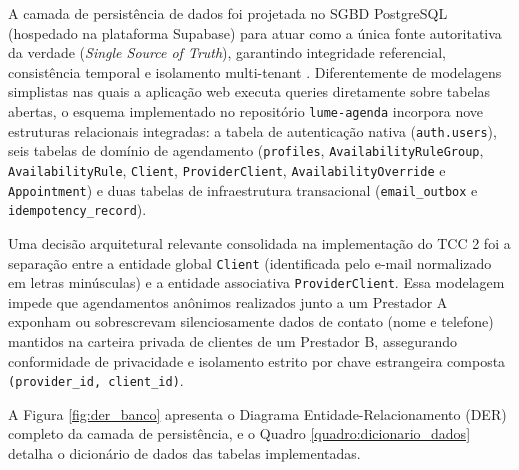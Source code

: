 \documentclass[12pt,a4paper]{article}
\begin{document}
A camada de persistência de dados foi projetada no SGBD PostgreSQL (hospedado na plataforma Supabase) para atuar como a única fonte autoritativa da verdade (\textit{Single Source of Truth}), garantindo integridade referencial, consistência temporal e isolamento multi-tenant \cite{elmasri2018}. Diferentemente de modelagens simplistas nas quais a aplicação web executa queries diretamente sobre tabelas abertas, o esquema implementado no repositório \texttt{lume-agenda} incorpora nove estruturas relacionais integradas: a tabela de autenticação nativa (\texttt{auth.users}), seis tabelas de domínio de agendamento (\texttt{profiles}, \texttt{AvailabilityRuleGroup}, \texttt{AvailabilityRule}, \texttt{Client}, \texttt{ProviderClient}, \texttt{AvailabilityOverride} e \texttt{Appointment}) e duas tabelas de infraestrutura transacional (\texttt{email\_outbox} e \texttt{idempotency\_record}).

Uma decisão arquitetural relevante consolidada na implementação do TCC 2 foi a separação entre a entidade global \texttt{Client} (identificada pelo e-mail normalizado em letras minúsculas) e a entidade associativa \texttt{ProviderClient}. Essa modelagem impede que agendamentos anônimos realizados junto a um Prestador A exponham ou sobrescrevam silenciosamente dados de contato (nome e telefone) mantidos na carteira privada de clientes de um Prestador B, assegurando conformidade de privacidade e isolamento estrito por chave estrangeira composta \texttt{(provider\_id, client\_id)}.

A Figura \ref{fig:der_banco} apresenta o Diagrama Entidade-Relacionamento (DER) completo da camada de persistência, e o Quadro \ref{quadro:dicionario_dados} detalha o dicionário de dados das tabelas implementadas.
\end{document}
